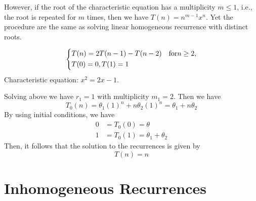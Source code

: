 However, if the root of the characteristic equation has a multiplicity \(m \leq 1\), i.e., the root is repeated for \(m\)  times, then we have \(T(n) = n^{m-1}x^n\). Yet the procedure are the same as solving linear homogeneous recurrence with distinct roots. 

\begin{eg}
    \[
        \begin{dcases}
            T(n) = 2T(n - 1) - T(n - 2)\quad\text{for} n \geq 2,\\
            T(0) = 0, T(1) = 1\\
        \end{dcases}
    \]
    Characteristic equation: \(x^2 = 2x - 1\). 

    Solving above we have \(r_1 = 1\) with multiplicity \(m_1 = 2\).
    Then we have
    \[
        T_0(n) = \theta_1 (1)^n + n\theta_2(1)^n = \theta_1+ n\theta_2
    \]
    By using initial conditions, we have
    \[
        \begin{aligned}
            0 &= T_0(0) = \theta \\
            1 &= T_0(1) = \theta_1 + \theta_2
        \end{aligned}
    \]
    Then, it follows that the solution to the recurrences is given by
    \[
        T(n) = n
    \]
\end{eg}



\section{Inhomogeneous Recurrences}